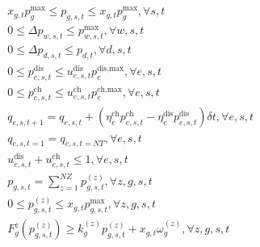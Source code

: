 \documentclass[lettersize,journal]{IEEEtran}
\newenvironment{newsubequations}{\small\begin{subequations}}{\end{subequations}}
\begin{document}
\begin{newsubequations}
\begin{align}
		 & x_{g,t} p_{g}^{\text{max}} \leq p_{g,s,t} \leq x_{g,t}p_{g}^{\text{max}}, \forall s, t \label{20-l}                                                                                                                         \\
		 & 0\leq \varDelta p_{w,s,t} \leq p_{w,s,t}^{\text{max}}, \forall w, s, t \label{20-m}                                                                                                                                         \\
		 & 0\leq \varDelta p_{d,s,t} \leq  p_{d,t}, \forall d, s, t \label{20-n}                                                                                                                                                       \\
		 & 0 \leq p_{e,s,t}^{\text{dis}} \leq u_{e,s,t}^{\text{dis}} p_{e}^{\text{dis,max}}, \forall e,s,t \label{20-o}                                                                                                                \\
		 & 0 \leq p_{e,s,t}^{\text{ch}} \leq u_{e,s,t}^{\text{ch}} p_{e}^{\text{ch,max}}, \forall e,s,t \label{20-p}                                                                                                                   \\
		 & q_{e,s,t+1} = q_{e,s,t} + \left(\eta_{e}^{\text{ch}}p_{e,s,t}^{\text{ch}} - \eta_{e}^{\text{dis}} p_{e,s,t}^{\text{dis}} \right)\delta t , \forall e,s,t \label{20-q}                                                       \\
		 & q_{e,s,t = 1} = q_{e,s,t = NT},  \forall e,s,t \label{20-r}                                                                                                                                                                 \\
		 & u_{e,s,t}^{\text{dis}} + u_{e,s,t}^{\text{ch}} \leq 1, \forall e,s,t \label{20-s}                                                                                                                                           \\
		 & p_{g,s,t} = \sum\nolimits_{z=1}^{NZ} p_{g,s,t}^{(z)},  \forall z, g,s, t\label{20-t}                                                                                                                                        \\
		 & 0 \leq p_{g,s,t}^{(z)} \leq x_{g,t} p_{g,s,t}^{\text{max}}, \forall z, g,s, t\label{20-u}                                                                                                                                   \\
		 & F_{g}^{z}\left( p_{g,s,t}^{(z)}\right) \geq k_{g}^{(z)} p_{g,s,t}^{(z)} + x_{g,t} \omega_{g}^{(z)}, \forall z, g, s, t \label{20-v}
	\end{align}
\end{newsubequations}
\end{document}
